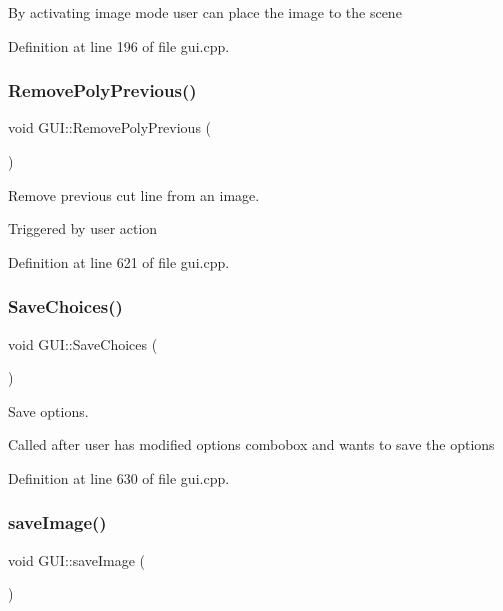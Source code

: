 By activating image mode user can place the image to the scene 

Definition at line 196 of file gui.\+cpp.

\mbox{\label{classGUI_abf8e1050ae4d599bf35af7b1f841d960}} 
\subsubsection{\texorpdfstring{Remove\+Poly\+Previous()}{RemovePolyPrevious()}}
{\footnotesize\ttfamily void G\+U\+I\+::\+Remove\+Poly\+Previous (\begin{DoxyParamCaption}{ }\end{DoxyParamCaption})}



Remove previous cut line from an image. 

Triggered by user action 

Definition at line 621 of file gui.\+cpp.

\mbox{\label{classGUI_a00fb847ea0a8249acaaf70c0f3ba3fd4}} 
\subsubsection{\texorpdfstring{Save\+Choices()}{SaveChoices()}}
{\footnotesize\ttfamily void G\+U\+I\+::\+Save\+Choices (\begin{DoxyParamCaption}{ }\end{DoxyParamCaption})}



Save options. 

Called after user has modified options combobox and wants to save the options 

Definition at line 630 of file gui.\+cpp.

\mbox{\label{classGUI_a44684af7706c021022520e2c4829c3ee}} 
\subsubsection{\texorpdfstring{save\+Image()}{saveImage()}}
{\footnotesize\ttfamily void G\+U\+I\+::save\+Image (\begin{DoxyParamCaption}{ }\end{DoxyParamCaption})}



